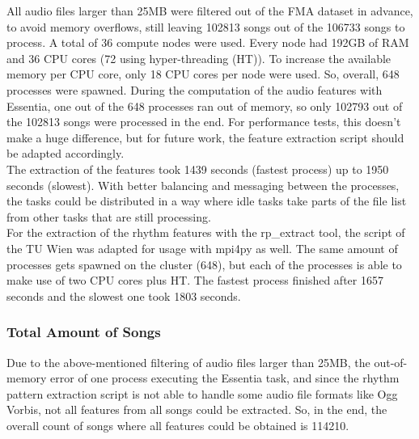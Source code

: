 \noindent All audio files larger than 25MB were filtered out of the FMA dataset in advance, to avoid memory overflows, still leaving 102813 songs out of the 106733 songs to process. A total of 36 compute nodes were used. Every node had 192GB of RAM and 36 CPU cores (72 using hyper-threading (HT)). To increase the available memory per CPU core, only 18 CPU cores per node were used. So, overall, 648 processes were spawned. During the computation of the audio features with Essentia, one out of the 648 processes ran out of memory, so only 102793 out of the 102813 songs were processed in the end. For performance tests, this doesn't make a huge difference, but for future work, the feature extraction script should be adapted accordingly.\\
The extraction of the features took 1439 seconds (fastest process) up to 1950 seconds (slowest). With better balancing and messaging between the processes, the tasks could be distributed in a way where idle tasks take parts of the file list from other tasks that are still processing.\\
\noindent For the extraction of the rhythm features with the rp\_extract tool, the script of the TU Wien was adapted for usage with mpi4py as well. The same amount of processes gets spawned on the cluster (648), but each of the processes is able to make use of two CPU cores plus HT. The fastest process finished after 1657 seconds and the slowest one took 1803 seconds.

\subsubsection{Total Amount of Songs}\label{totamsong}

Due to the above-mentioned filtering of audio files larger than 25MB, the out-of-memory error of one process executing the Essentia task, and since the rhythm pattern extraction script is not able to handle some audio file formats like Ogg Vorbis, not all features from all songs could be extracted. So, in the end, the overall count of songs where all features could be obtained is 114210.\\


